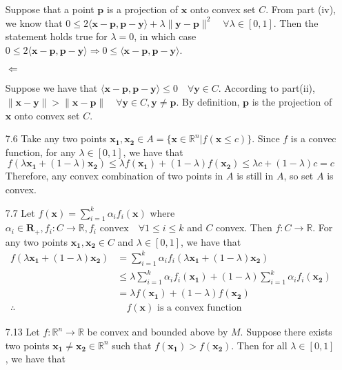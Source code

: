 \documentclass[letterpaper,12pt]{article}
\theoremstyle{definition}
\begin{document}
\begin{enumerate}
    Suppose that a point $\mathbf{p}$ is a projection of $\mathbf{x}$ onto convex set $C$. From part (iv), we know that $0 \leq 2\langle \mathbf{x}-\mathbf{p},\mathbf{p}-\mathbf{y} \rangle + \lambda\|\mathbf{y}-\mathbf{p}\|^2 \quad\forall\lambda\in[0,1]$. Then the statement holds true for $\lambda=0$, in which case $0 \leq 2\langle \mathbf{x}-\mathbf{p},\mathbf{p}-\mathbf{y} \rangle\Longrightarrow 0 \leq \langle \mathbf{x}-\mathbf{p},\mathbf{p}-\mathbf{y} \rangle$.

    $\Longleftarrow$

    Suppose we have that $\langle\mathbf{x}-\mathbf{p},\mathbf{p}-\mathbf{y}\rangle \leq 0 \quad\forall \mathbf{y}\in C$. According to part(ii), $\|\mathbf{x}-\mathbf{y}\| > \|\mathbf{x}-\mathbf{p}\| \quad \forall \mathbf{y}\in C, \mathbf{y}\neq\mathbf{p}$. By definition, $\mathbf{p}$ is the projection of $\mathbf{x}$ onto convex set $C$.
  \item[7.6]
    Take any two points $\mathbf{x_1},\mathbf{x_2} \in A=\{\mathbf{x}\in\mathbb{R}^n|f(\mathbf{x}\leq c)\}$. Since $f$ is a convec function, for any $\lambda\in[0,1]$, we have that
    \begin{equation*}
      f(\lambda\mathbf{x_1}+(1-\lambda)\mathbf{x_2}) \leq \lambda f(\mathbf{x_1})+(1-\lambda)f(\mathbf{x_2}) \leq \lambda c + (1-\lambda)c = c
    \end{equation*}
    Therefore, any convex combination of two points in $A$ is still in $A$, so set $A$ is convex.
  \item[7.7]
    Let $f(\mathbf{x}) = \sum_{i=1}^k \alpha_i f_i(\mathbf{x})$ where $\alpha_i\in \mathbf{R}_+, f_i:C\rightarrow \mathbb{R},f_i\text{ convex} \quad \forall 1\leq i \leq k$ and $C$ convex. Then $f:C\rightarrow\mathbb{R}$. For any two points $\mathbf{x_1},\mathbf{x_2}\in C$ and $\lambda\in[0,1]$, we have that
    \begin{align*}
      f(\lambda\mathbf{x_1}+(1-\lambda)\mathbf{x_2}) &= \sum_{i=1}^k \alpha_i f_i(\lambda\mathbf{x_1}+(1-\lambda)\mathbf{x_2}) \\
      &\leq \lambda\sum_{i=1}^k \alpha_i f_i(\mathbf{x_1}) + (1-\lambda)\sum_{i=1}^k \alpha_if_i(\mathbf{x_2}) \\
      &= \lambda f(\mathbf{x_1})+ (1-\lambda)f(\mathbf{x_2}) \\
      \therefore & \quad f(\mathbf{x}) \text{ is a convex function}
    \end{align*}
  \item[7.13]
    Let $f:\mathbb{R}^n\rightarrow \mathbb{R}$ be convex and bounded above by $M$. Suppose there exists two points $\mathbf{x_1}\neq\mathbf{x_2} \in \mathbb{R}^n$ such that $f(\mathbf{x_1})>f(\mathbf{x_2})$. Then for all $\lambda\in[0,1]$, we have that

\end{enumerate}
\end{document}
